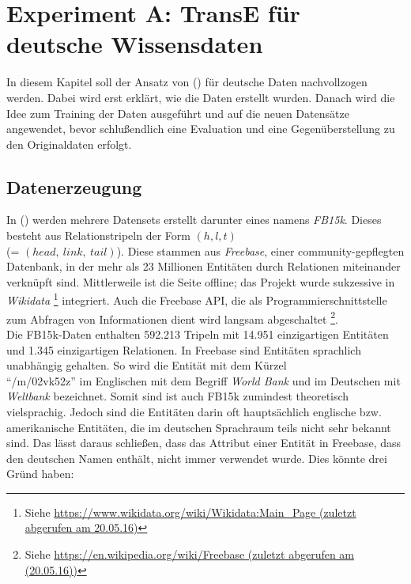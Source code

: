 
\chapter{Experiment A: TransE für deutsche Wissensdaten} %

\label{Chapter7} %


In diesem Kapitel soll der Ansatz von (\cite{bordes2013translating}) für deutsche Daten nachvollzogen werden.
Dabei wird erst erklärt, wie die Daten erstellt wurden. Danach wird die Idee zum Training der Daten ausgeführt und
auf die neuen Datensätze angewendet, bevor schlußendlich eine Evaluation und eine Gegenüberstellung zu den Originaldaten
erfolgt.

\section{Datenerzeugung}

In (\cite{bordes2013translating}) werden mehrere Datensets erstellt darunter eines namens \emph{FB15k}. Dieses
besteht aus Relationstripeln der Form $(h, l, t)$\\
(= $(head,\ link,\ tail)$). Diese stammen aus \emph{Freebase}, einer
community-gepflegten Datenbank, in der mehr als 23 Millionen Entitäten durch Relationen miteinander verknüpft sind.
Mittlerweile ist die Seite offline; das Projekt wurde sukzessive in \emph{Wikidata}
\footnote{Siehe \url{https://www.wikidata.org/wiki/Wikidata:Main_Page (zuletzt abgerufen am 20.05.16)}} integriert. Auch die
Freebase API, die als Programmierschnittstelle zum Abfragen von Informationen dient wird langsam abgeschaltet
\footnote{Siehe \url{https://en.wikipedia.org/wiki/Freebase (zuletzt abgerufen am (20.05.16))}}.\\

Die FB15k-Daten enthalten 592.213 Tripeln mit 14.951 einzigartigen Entitäten und 1.345 einzigartigen Relationen.
In Freebase sind Entitäten sprachlich unabhängig gehalten. So wird die Entität mit dem Kürzel \\``/m/02vk52z''
im Englischen mit dem Begriff \emph{World Bank} und im Deutschen mit \emph{Weltbank} bezeichnet. Somit sind ist auch
FB15k zumindest theoretisch vielsprachig. Jedoch sind die Entitäten darin oft hauptsächlich englische bzw. amerikanische
Entitäten, die im deutschen Sprachraum teils nicht sehr bekannt sind. Das lässt daraus schließen, dass das Attribut einer
Entität in Freebase, dass den deutschen Namen enthält, nicht immer verwendet wurde. Dies könnte drei Gründ haben:


